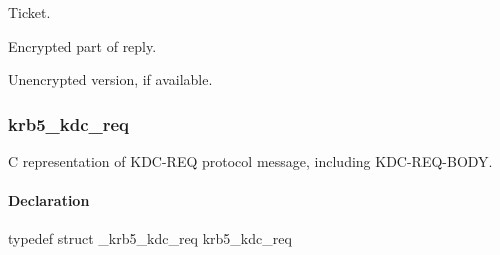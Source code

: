 \documentclass[letterpaper,10pt,english]{sphinxmanual}
\begin{document}

\begin{fulllineitems}
\label{appdev/refs/types/krb5_kdc_rep:c.krb5_kdc_rep.ticket}
Ticket.

\end{fulllineitems}


\begin{fulllineitems}
\label{appdev/refs/types/krb5_kdc_rep:c.krb5_kdc_rep.enc_part}
Encrypted part of reply.

\end{fulllineitems}


\begin{fulllineitems}
\label{appdev/refs/types/krb5_kdc_rep:c.krb5_kdc_rep.enc_part2}
Unencrypted version, if available.

\end{fulllineitems}



\subsubsection{krb5\_kdc\_req}
\label{appdev/refs/types/krb5_kdc_req:krb5-kdc-req-struct}\label{appdev/refs/types/krb5_kdc_req:krb5-kdc-req}\label{appdev/refs/types/krb5_kdc_req::doc}

\begin{fulllineitems}
\label{appdev/refs/types/krb5_kdc_req:c.krb5_kdc_req}
\end{fulllineitems}


C representation of KDC-REQ protocol message, including KDC-REQ-BODY.


\paragraph{Declaration}
\label{appdev/refs/types/krb5_kdc_req:declaration}
typedef struct \_krb5\_kdc\_req  krb5\_kdc\_req
\end{document}
